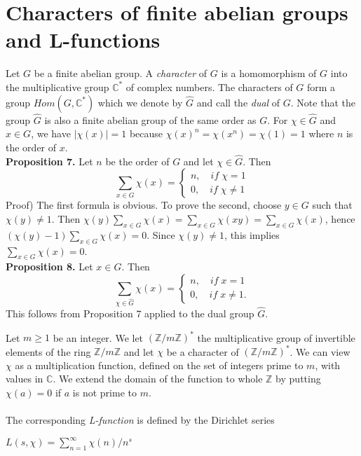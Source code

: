 \documentclass[11pt]{article}
\begin{document}
\section{Characters of finite abelian groups and L-functions}
Let $G$ be a finite abelian group. A \textit{character} of $G$ is a homomorphism of $G$ into the multiplicative group $\mathbb{C}^*$ of complex numbers. The characters of $G$ form a group $Hom(G,\mathbb{C}^*)$ which we denote by $\hat{G}$ and call the \textit{dual} of $G$. Note that the group $\hat{G}$ is also a finite abelian group of the same order as $G$. For $\chi\in\hat{G}$ and $x\in G$, we have $|\chi(x)|=1$ because $\chi(x)^n=\chi(x^n)=\chi(1)=1$ where $n$ is the order of $x$.
\vspace{5mm}
\\
\textbf{Proposition 7.}
Let $n$ be the order of $G$ and let $\chi\in\hat{G}$. Then
\begin{equation*}
    \displaystyle\sum_{x\in G} \chi(x)=\left \{\begin{array}{l}
    n,\quad if \; \chi=1 \\
    0,\quad if \; \chi\neq 1
    \end{array}
    \right.
\end{equation*}
Proof) The first formula is obvious. To prove the second, choose $y\in G$ such that $\chi(y)\neq 1$. Then $\chi(y)\displaystyle\sum_{x\in G} \chi(x)=\displaystyle\sum_{x\in G} \chi(xy)=\displaystyle\sum_{x\in G} \chi(x)$, hence $(\chi(y)-1)\displaystyle\sum_{x\in G} \chi(x)=0$. Since $\chi(y)\neq 1$, this implies $\displaystyle\sum_{x\in G} \chi(x)=0$.
\vspace{10mm}
\\
\textbf{Proposition 8.}
Let $x \in G$. Then
\begin{equation*}
    \displaystyle\sum_{\chi\in \hat{G}} \chi(x)=\left \{\begin{array}{l}
    n,\quad if \; x=1 \\
    0,\quad if \; x\neq 1.
    \end{array}
    \right.
\end{equation*}
This follows from Proposition 7 applied to the dual group $\hat{G}$.
\vspace{10mm}

Let $m\geq 1$ be an integer. We let $(\mathbb{Z}/m\mathbb{Z})^*$ the multiplicative group of invertible elements of the ring $\mathbb{Z}/m\mathbb{Z}$ and let $\chi$ be a character of $(\mathbb{Z}/m\mathbb{Z})^*$. We can view $\chi$ as a multiplication function, defined on the set of integers prime to $m$, with values in $\mathbb{C}$. We extend the domain of the function to whole $\mathbb{Z}$ by putting $\chi(a)=0$ if $a$ is not prime to $m$.
\\
\\
The corresponding \textit{L-function} is defined by the Dirichlet series
\begin{center}
    $L(s,\chi)=\displaystyle\sum_{n=1}^{\infty} \chi(n)/n^s$
\end{center}
\vspace{2mm}
\end{document}

